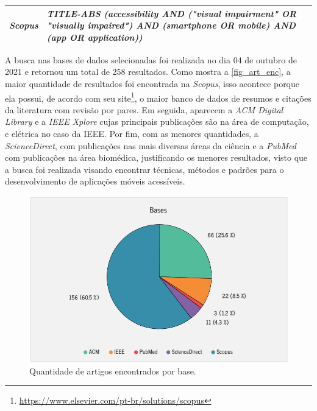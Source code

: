 \begin{quadro}[htb]
\begin{tabular}{|m{3.5cm} | m{11.5cm}|}
    \emph{Scopus}              & \emph{TITLE-ABS (accessibility AND ("visual impairment" OR "visually impaired") AND (smartphone OR mobile) AND (app OR application))}                                                                                                                                                                                                                                                                                                          \\ \hline
  \end{tabular}
\end{quadro}

A busca nas bases de dados selecionadas foi realizada no dia 04 de outubro de 2021 e retornou um total de 258 resultados.
Como mostra a \autoref{fig_art_enc}, a maior quantidade de resultados foi encontrada na \emph{Scopus}, isso acontece porque ela possui, de acordo com seu site\footnote{\url{https://www.elsevier.com/pt-br/solutions/scopus}}, o maior banco de dados de resumos e citações da literatura com revisão por pares.
Em seguida, aparecem a \emph{ACM Digital Library} e a \emph{IEEE Xplore} cujas principais publicações são na área de computação, e elétrica no caso da IEEE\@.
Por fim, com as menores quantidades, a \emph{ScienceDirect}, com publicações nas mais diversas áreas da ciência e a \emph{PubMed} com publicações na área biomédica, justificando os menores resultados, visto que a busca foi realizada visando encontrar técnicas, métodos e padrões para o desenvolvimento de aplicações móveis acessíveis.

\begin{figure}[htb]
  \caption{\label{fig_art_enc}Quantidade de artigos encontrados por base.}
  \begin{center}
    \includegraphics[scale=0.725]{Imagens/msl/artigos_encontrados.png}
  \end{center}
\end{figure}

